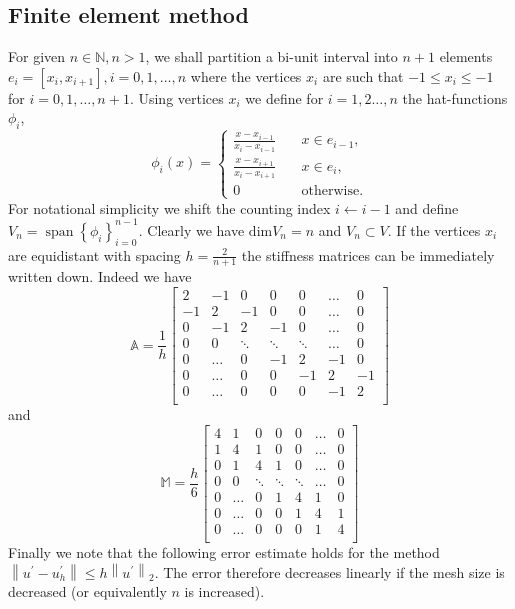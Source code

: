 \documentclass[a4paper,10pt]{article}
\newcommand{\norm}[1]{\ensuremath{\left\|#1\right\|}}
\newcommand{\Amat}{\ensuremath{\mathbb{A}}}
\newcommand{\Mmat}{\ensuremath{\mathbb{M}}}
\DeclareMathOperator{\spn}{span}
\begin{document}
  \subsection{Finite element method}
  For given $n\in\mathbb{N}, n>1$, we shall partition a bi-unit interval into
  $n+1$ elements $e_i=\left[x_i, x_{i+1}\right], i=0, 1, \dots, n$ where the
  vertices $x_i$ are such that $-1\leq x_i\leq-1$ for $i=0, 1, \dots, n+1$. Using
  vertices $x_i$ we define for $i=1,2\dots,n$ the hat-functions $\phi_i$,
  \begin{equation}
    \label{eq:hat}
    \phi_i(x)=\begin{cases}
      \frac{x-x_{i-1}}{x_i-x_{i-1}}&\quad x\in e_{i-1},\\
      \frac{x-x_{i+1}}{x_i-x_{i+1}}&\quad x\in e_{i},\\
      0&\quad\text{otherwise}.
               \end{cases}
  \end{equation}
  For notational simplicity we shift the counting index $i\leftarrow i-1$ and
  define $V_n=\spn\left\{\phi_i\right\}_{i=0}^{n-1}$. Clearly we have
  $\text{dim}V_n=n$ and $V_n\subset V$. If the vertices $x_i$ are equidistant
  with spacing $h=\tfrac{2}{n+1}$ the stiffness matrices can be immediately
  written down. Indeed we have
  \[
    \Amat = \frac{1}{h}\begin{bmatrix}
      2 & -1 & 0 & 0 & 0 &\dots & 0 \\
      -1 & 2 & -1 & 0 & 0 &\dots & 0 \\
      0  & -1 & 2 & -1 & 0&\dots & 0 \\
      0  & 0 & \ddots & \ddots & \ddots &\dots & 0\\
      0 & \dots & 0 & -1 & 2 & -1 & 0 \\
      0 & \dots & 0 & 0 & -1 & 2 & -1 \\
      0 & \dots & 0 & 0 & 0 & -1 & 2 \\
          \end{bmatrix}
  \]
  and
  \[
    \Mmat = \frac{h}{6}\begin{bmatrix}
      4 & 1 & 0 & 0 & 0 &\dots & 0 \\
      1 & 4 & 1 & 0 & 0 &\dots & 0 \\
      0  & 1 & 4 & 1 & 0&\dots & 0 \\
      0  & 0 & \ddots & \ddots & \ddots &\dots & 0\\
      0 & \dots & 0 & 1 & 4 & 1 & 0 \\
      0 & \dots & 0 & 0 & 1 & 4 & 1 \\
      0 & \dots & 0 & 0 & 0 & 1 & 4 \\
          \end{bmatrix}
  \]
  Finally we note that the following error estimate holds for the method 
  $\norm{u^{\prime}-u_h^{\prime}}\leq h\norm{u^{\prime}}_2$. The error therefore
  decreases linearly if the mesh size is decreased (or equivalently $n$ is
  increased).
\end{document}
